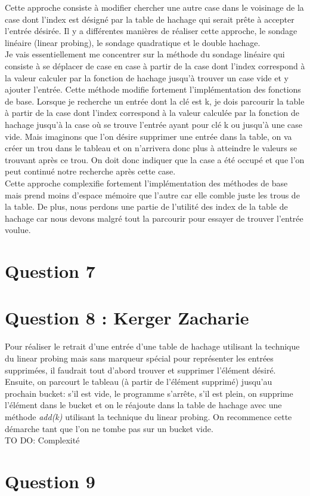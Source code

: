 \documentclass[10pt,a4paper]{article}
\begin{document}
 Cette approche consiste à modifier chercher une autre case dans le voisinage de la case dont l'index est désigné par la table de hachage qui serait prête à accepter l'entrée désirée. Il y a différentes manières de réaliser cette approche, le sondage linéaire (linear probing), le sondage quadratique et le double hachage. \\

Je vais essentiellement me concentrer sur la méthode du sondage linéaire qui consiste à se déplacer de case en case à partir de la case dont l'index correspond à la valeur calculer par la fonction de hachage jusqu'à trouver un case vide et y ajouter l'entrée. Cette méthode modifie fortement l'implémentation des fonctions de base. Lorsque je recherche un entrée dont la clé est k, je dois parcourir la table à partir de la case dont l'index correspond à la valeur calculée par la fonction de hachage jusqu'à la case où se trouve l'entrée ayant pour clé k ou jusqu'à une case vide. Mais imaginons que l'on désire supprimer une entrée dans la table, on va créer un trou dans le tableau et on n'arrivera donc plus à atteindre le valeurs se trouvant après ce trou. On doit donc indiquer que la case a été occupé et que l'on peut continué notre recherche après cette case.\\

Cette approche complexifie fortement l'implémentation des méthodes de base mais prend moins d'espace mémoire que l'autre car elle comble juste les trous de la table. De plus, nous perdons une partie de l'utilité des index de la table de hachage car nous devons malgré tout la parcourir pour essayer de trouver l'entrée voulue.\\
\section*{Question 7}
\section*{Question 8 : Kerger Zacharie}

Pour réaliser le retrait d'une entrée d'une table de hachage utilisant la technique du linear probing mais sans marqueur spécial pour représenter les entrées supprimées, il faudrait tout d'abord trouver et supprimer l'élément désiré. Ensuite, on parcourt le tableau (à partir de l'élément supprimé) jusqu'au prochain bucket: s'il est vide, le programme s'arrête, s'il est plein, on supprime l'élément dans le bucket et on le réajoute dans la table de hachage avec une méthode \emph{add(k)} utilisant la technique du linear probing. On recommence cette démarche tant que l'on ne tombe pas sur un bucket vide.\\
\newline
TO DO: Complexité


\section*{Question 9}
\end{document}
